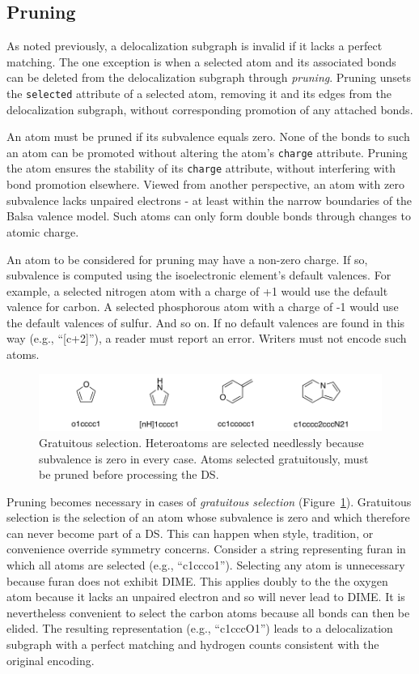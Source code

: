 \documentclass{article}
\def\ttt{\texttt}
\begin{document}
\subsection*{Pruning}

As noted previously, a delocalization subgraph is invalid if it lacks a perfect matching. The one exception is when a selected atom and its associated bonds can be deleted from the delocalization subgraph through \textit{pruning}. Pruning unsets the \ttt{selected} attribute of a selected atom, removing it and its edges from the delocalization subgraph, without corresponding promotion of any attached bonds.

An atom must be pruned if its subvalence equals zero. None of the bonds to such an atom can be promoted without altering the atom's \ttt{charge} attribute. Pruning the atom ensures the stability of its \ttt{charge} attribute, without interfering with bond promotion elsewhere. Viewed from another perspective, an atom with zero subvalence lacks unpaired electrons - at least within the narrow boundaries of the Balsa valence model. Such atoms can only form double bonds through changes to atomic charge. 

An atom to be considered for pruning may have a non-zero charge. If so, subvalence is computed using the isoelectronic element's default valences. For example, a selected nitrogen atom with a charge of +1 would use the default valence for carbon. A selected phosphorous atom with a charge of -1 would use the default valences of sulfur. And so on. If no default valences are found in this way (e.g., \enquote{[c+2]}), a reader must report an error. Writers must not encode such atoms.

\begin{figure}
    \centering
    \includegraphics[width=\columnwidth]{gratuitous-selection.pdf}
    \caption{Gratuitous selection. Heteroatoms are selected needlessly because subvalence is zero in every case. Atoms selected gratuitously, must be pruned before processing the DS.}
    \label{fig:gratuitous-selection}
\end{figure}

Pruning becomes necessary in cases of \textit{gratuitous selection} (Figure~\ref{fig:gratuitous-selection}). Gratuitous selection is the selection of an atom whose subvalence is zero and which therefore can never become part of a DS. This can happen when style, tradition, or convenience override symmetry concerns. Consider a string representing furan in which all atoms are selected (e.g., \enquote{c1ccco1}). Selecting any atom is unnecessary because furan does not exhibit DIME. This applies doubly to the the oxygen atom because it lacks an unpaired electron and so will never lead to DIME. It is nevertheless convenient to select the carbon atoms because all bonds can then be elided. The resulting representation (e.g., \enquote{c1cccO1}) leads to a delocalization subgraph with a perfect matching and hydrogen counts consistent with the original encoding.
\end{document}
